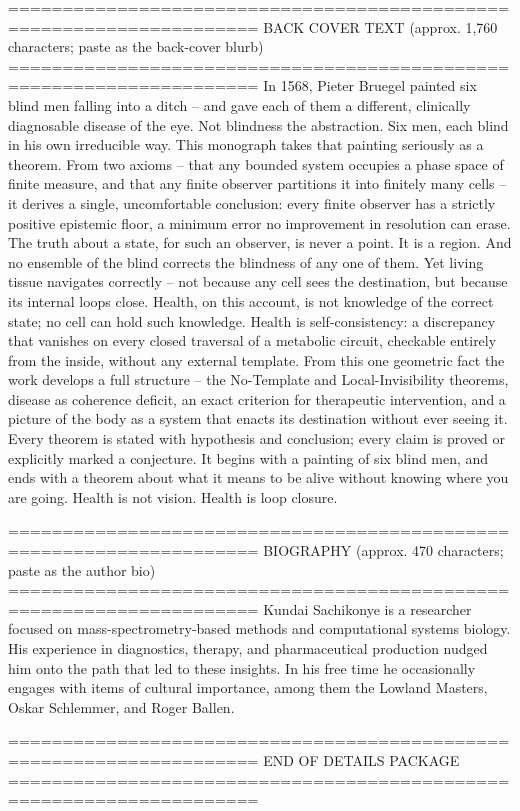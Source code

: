 =====================================================================
BACK COVER TEXT
(approx. 1,760 characters; paste as the back-cover blurb)
=====================================================================
%
 In 1568, Pieter Bruegel painted six blind men falling into a ditch --
and gave each of them a different, clinically diagnosable disease of
the eye. Not blindness the abstraction. Six men, each blind in his own
irreducible way.
%
This monograph takes that painting seriously as a theorem. From two
axioms -- that any bounded system occupies a phase space of finite
measure, and that any finite observer partitions it into finitely many
cells -- it derives a single, uncomfortable conclusion: every finite
observer has a strictly positive epistemic floor, a minimum error no
improvement in resolution can erase. The truth about a state, for such
an observer, is never a point. It is a region. And no ensemble of the
blind corrects the blindness of any one of them.
%
Yet living tissue navigates correctly -- not because any cell sees the
destination, but because its internal loops close. Health, on this
account, is not knowledge of the correct state; no cell can hold such
knowledge. Health is self-consistency: a discrepancy that vanishes on
every closed traversal of a metabolic circuit, checkable entirely from
the inside, without any external template.
%
From this one geometric fact the work develops a full structure -- the
No-Template and Local-Invisibility theorems, disease as coherence
deficit, an exact criterion for therapeutic intervention, and a picture
of the body as a system that enacts its destination without ever seeing
it. Every theorem is stated with hypothesis and conclusion; every claim
is proved or explicitly marked a conjecture.
%
It begins with a painting of six blind men, and ends with a theorem
about what it means to be alive without knowing where you are going.
%
Health is not vision. Health is loop closure.


=====================================================================
BIOGRAPHY
(approx. 470 characters; paste as the author bio)
=====================================================================
%
Kundai Sachikonye is a researcher focused on mass-spectrometry-based
methods and computational systems biology. His experience in
diagnostics, therapy, and pharmaceutical production nudged him onto the
path that led to these insights. In his free time he occasionally
engages with items of cultural importance, among them the Lowland
Masters, Oskar Schlemmer, and Roger Ballen.


=====================================================================
END OF DETAILS PACKAGE
=====================================================================
